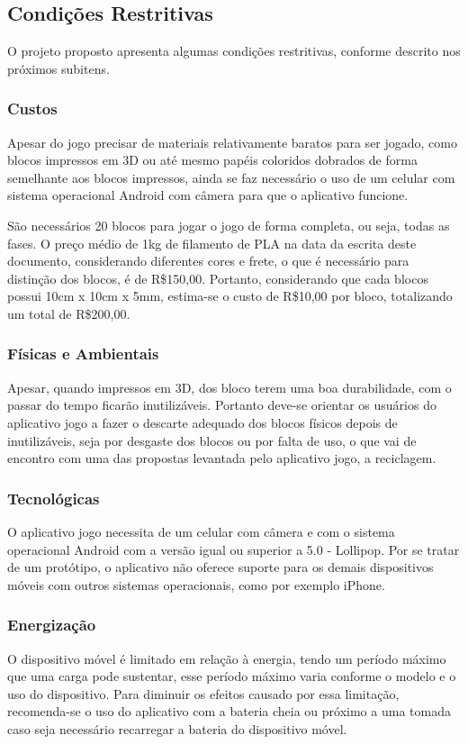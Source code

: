     \subsection{Condições Restritivas}
    O projeto proposto apresenta algumas condições restritivas, conforme descrito nos próximos subitens.

        \subsubsection{Custos}
        Apesar do jogo precisar de materiais relativamente baratos para ser jogado, como blocos impressos em 3D ou até mesmo papéis coloridos dobrados de forma semelhante aos blocos impressos, ainda se faz necessário o uso de um celular com sistema operacional Android com câmera para que o aplicativo funcione. 
        
        São necessários 20 blocos para jogar o jogo de forma completa, ou seja, todas as fases. O preço médio de 1kg de filamento de PLA na data da escrita deste documento, considerando diferentes cores e frete, o que é necessário para distinção dos blocos, é de R\$150,00. Portanto, considerando que cada blocos possui 10cm x 10cm x 5mm, estima-se o custo de R\$10,00 por bloco, totalizando um total de R\$200,00.
            
        \subsubsection{Físicas e Ambientais}
        Apesar, quando impressos em 3D, dos bloco terem uma boa durabilidade, com o passar do tempo ficarão inutilizáveis. Portanto deve-se orientar os usuários do aplicativo jogo a fazer o descarte adequado dos blocos físicos depois de inutilizáveis, seja por desgaste dos blocos ou por falta de uso, o que vai de encontro com uma das propostas levantada pelo aplicativo jogo, a reciclagem.
        
        \subsubsection{Tecnológicas}
        O aplicativo jogo necessita de um celular com câmera e com o sistema operacional Android com a versão igual ou superior a 5.0 - Lollipop. Por se tratar de um protótipo, o aplicativo não oferece suporte para os demais dispositivos móveis com outros sistemas operacionais, como por exemplo iPhone. 
        
        \subsubsection{Energização}
        O dispositivo móvel é limitado em relação à energia, tendo um período máximo que uma carga pode sustentar, esse período máximo varia conforme o modelo e o uso do dispositivo. Para diminuir os efeitos causado por essa limitação, recomenda-se o uso do aplicativo com a bateria cheia ou próximo a uma tomada caso seja necessário recarregar a bateria do dispositivo móvel.    
        
